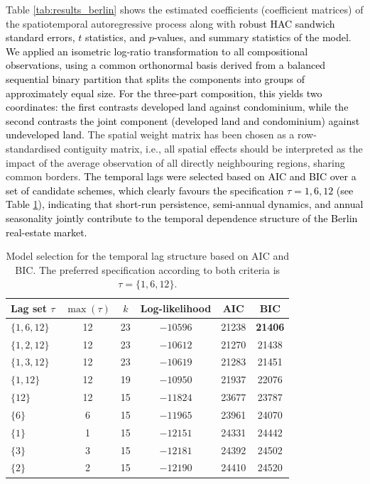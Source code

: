\documentclass[12pt]{article}
\theoremstyle{plain}
\theoremstyle{definition}
\begin{document}
Table \ref{tab:results_berlin} shows the estimated coefficients (coefficient matrices) of the spatiotemporal autoregressive process along with \textcolor{black}{robust HAC sandwich standard errors, $t$ statistics, and $p$-values, and summary statistics of the model}. \textcolor{black}{We applied an isometric log-ratio transformation to all compositional observations, using a common orthonormal basis derived from a balanced sequential binary partition that splits the components into groups of approximately equal size.  For the three-part composition, this yields two coordinates: the first contrasts developed land against condominium, while the second contrasts the joint  component (developed land and condominium) against undeveloped land.} The spatial weight matrix has been chosen as a row-standardised contiguity matrix, i.e., all spatial effects should be interpreted as the impact of the average observation of all directly neighbouring regions, sharing common borders. \textcolor{black}{The temporal lags were selected based on AIC and BIC over a set of candidate schemes, which clearly favours the specification $\tau={1,6,12}$ (see Table \ref{tab:model_selection}), indicating that short-run persistence, semi-annual dynamics, and annual seasonality jointly contribute to the temporal dependence structure of the Berlin real-estate market.}

\begin{table}[t]
\centering
\begin{tabular}{l c c c c c}
\hline
Lag set $\tau$ & $\max(\tau)$ & $k$ & Log-likelihood & AIC & BIC \\
\hline
$\{1,6,12\}$  & 12 & 23 & $-10596$ & 21238 & \textbf{21406} \\
$\{1,2,12\}$  & 12 & 23 & $-10612$ & 21270 & 21438 \\
$\{1,3,12\}$  & 12 & 23 & $-10619$ & 21283 & 21451 \\
$\{1,12\}$    & 12 & 19 & $-10950$ & 21937 & 22076 \\
$\{12\}$      & 12 & 15 & $-11824$ & 23677 & 23787 \\
$\{6\}$       & 6  & 15 & $-11965$ & 23961 & 24070 \\
$\{1\}$       & 1  & 15 & $-12151$ & 24331 & 24442 \\
$\{3\}$       & 3  & 15 & $-12181$ & 24392 & 24502 \\
$\{2\}$       & 2  & 15 & $-12190$ & 24410 & 24520 \\
\hline
\end{tabular}
\caption{Model selection for the temporal lag structure based on AIC and BIC. The preferred specification according to both criteria is $\tau=\{1,6,12\}$.}
\label{tab:model_selection}
\end{table}
\end{document}
